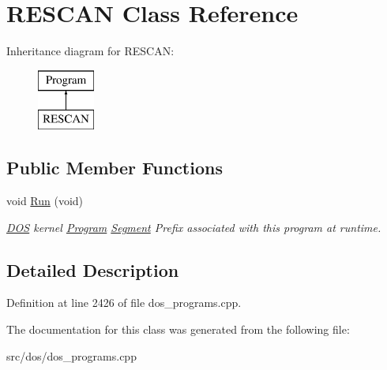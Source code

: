 \hypertarget{classRESCAN}{\section{R\-E\-S\-C\-A\-N Class Reference}
\label{classRESCAN}
}
Inheritance diagram for R\-E\-S\-C\-A\-N\-:\begin{figure}[H]
\begin{center}
\leavevmode
\includegraphics[height=2.000000cm]{classRESCAN}
\end{center}
\end{figure}
\subsection*{Public Member Functions}
\begin{DoxyCompactItemize}
\item 
\hypertarget{classRESCAN_af3bea53bb1105100a4703c239c701df6}{void \hyperlink{classRESCAN_af3bea53bb1105100a4703c239c701df6}{Run} (void)}\label{classRESCAN_af3bea53bb1105100a4703c239c701df6}

\begin{DoxyCompactList}\small\item\em \hyperlink{classDOS}{D\-O\-S} kernel \hyperlink{classProgram}{Program} \hyperlink{structSegment}{Segment} Prefix associated with this program at runtime. \end{DoxyCompactList}\end{DoxyCompactItemize}


\subsection{Detailed Description}


Definition at line 2426 of file dos\-\_\-programs.\-cpp.



The documentation for this class was generated from the following file\-:\begin{DoxyCompactItemize}
\item 
src/dos/dos\-\_\-programs.\-cpp\end{DoxyCompactItemize}
